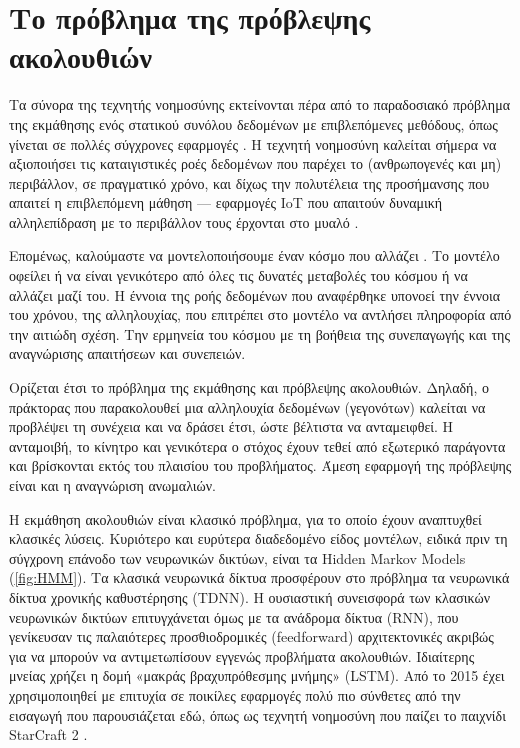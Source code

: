 \section{Το πρόβλημα της πρόβλεψης ακολουθιών}

	Τα σύνορα της τεχνητής νοημοσύνης εκτείνονται πέρα από το παραδοσιακό πρόβλημα της εκμάθησης ενός στατικού συνόλου δεδομένων με επιβλεπόμενες μεθόδους,
	όπως γίνεται σε πολλές σύγχρονες εφαρμογές \parencite{lecun}.
	Η τεχνητή νοημοσύνη καλείται σήμερα να αξιοποιήσει τις καταιγιστικές ροές δεδομένων που παρέχει το (ανθρωπογενές και μη) περιβάλλον, σε πραγματικό χρόνο,
	και δίχως την πολυτέλεια της προσήμανσης που απαιτεί η επιβλεπόμενη μάθηση ---
	εφαρμογές IoT που απαιτούν δυναμική αλληλεπίδραση με το περιβάλλον τους έρχονται στο μυαλό \parencite{mohammadiDeepLearningIoT2018}.

	Επομένως, καλούμαστε να μοντελοποιήσουμε έναν κόσμο που αλλάζει \parencite{staticbottleneck}.
	Το μοντέλο οφείλει ή να είναι γενικότερο από όλες τις δυνατές μεταβολές του κόσμου ή να αλλάζει μαζί του.
	Η έννοια της ροής δεδομένων που αναφέρθηκε υπονοεί την έννοια του χρόνου, της αλληλουχίας, που επιτρέπει στο μοντέλο να αντλήσει πληροφορία από την αιτιώδη σχέση.
	Την ερμηνεία του κόσμου με τη βοήθεια της συνεπαγωγής και της αναγνώρισης απαιτήσεων και συνεπειών.

	Ορίζεται έτσι το πρόβλημα της εκμάθησης και πρόβλεψης ακολουθιών.
	Δηλαδή, ο πράκτορας που παρακολουθεί μια αλληλουχία δεδομένων (γεγονότων) καλείται να προβλέψει τη συνέχεια και να δράσει έτσι, ώστε βέλτιστα να ανταμειφθεί.
	Η ανταμοιβή, το κίνητρο και γενικότερα ο στόχος έχουν τεθεί από εξωτερικό παράγοντα και βρίσκονται εκτός του πλαισίου του προβλήματος.
	Άμεση εφαρμογή της πρόβλεψης είναι και η αναγνώριση ανωμαλιών.

	Η εκμάθηση ακολουθιών είναι κλασικό πρόβλημα, για το οποίο έχουν αναπτυχθεί κλασικές λύσεις.
	Κυριότερο και ευρύτερα διαδεδομένο είδος μοντέλων, ειδικά πριν τη σύγχρονη επάνοδο των νευρωνικών δικτύων, είναι τα Hidden Markov Models (\ref{fig:HMM}).
	Τα κλασικά νευρωνικά δίκτυα προσφέρουν στο πρόβλημα τα νευρωνικά δίκτυα χρονικής καθυστέρησης (TDNN).
	Η ουσιαστική συνεισφορά των κλασικών νευρωνικών δικτύων επιτυγχάνεται όμως με τα ανάδρομα δίκτυα (RNN),
	που γενίκευσαν τις παλαιότερες προσθιοδρομικές (feedforward) αρχιτεκτονικές ακριβώς για να μπορούν να αντιμετωπίσουν εγγενώς προβλήματα ακολουθιών.
	Ιδιαίτερης μνείας χρήζει η δομή «μακράς βραχυπρόθεσμης μνήμης» (LSTM).
	Από το 2015 έχει χρησιμοποιηθεί με επιτυχία σε ποικίλες εφαρμογές πολύ πιο σύνθετες από την εισαγωγή που παρουσιάζεται εδώ,
	όπως ως τεχνητή νοημοσύνη που παίζει το παιχνίδι StarCraft 2 \parencite[AlphaStar][]{vinyalsAlphaStarMasteringRealTime2019}.

